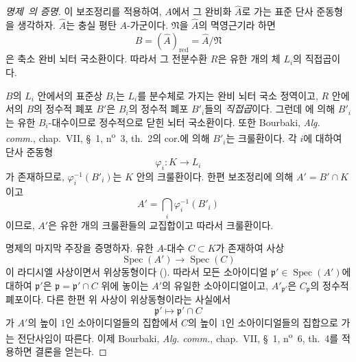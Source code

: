 \begin{proof}[명제~의 증명]
이 보조정리를 적용하여, $A$에서 그 완비화 $\widehat A$로 가는 표준
단사 준동형을 생각하자. $\widehat A$는 충실 평탄 $A$-가군이다.
$\mathfrak N$을 $\widehat A$의 멱영근기라 하면
\[
  B=(\widehat A)_{\mathrm{red}}=\widehat A/\mathfrak N
\]
은 축소 완비 뇌터 국소환이다. 따라서 그 전분수환 $R$은 유한 개의
체 $L_i$의 직접곱이다.


$B$의 $L_i$ 안에서의 표준상 $B_i$는 $L_i$를 분수체로 가지는
완비 뇌터 국소 정역이고, $R$ 안에서의 $B$의 정수적 폐포 $B'$은
$B_i$의 정수적 폐포 $B'_i$들의 \emph{직접곱}이다. 그런데
에 의해 $B'_i$는 유한 $B_i$-대수이므로 정수적으로
닫힌 뇌터 국소환이다. 또한 Bourbaki, \emph{Alg. comm.}, chap.~VII,
§~1, n\textsuperscript{o}~3, th.~2의 cor.에 의해 $B'_i$는
크룰환이다. 각 $i$에 대하여 단사 준동형
\[
  \varphi_i:K\longrightarrow L_i
\]
가 존재하므로, $\varphi_i^{-1}(B'_i)$는 $K$ 안의 크룰환이다. 한편
보조정리에 의해 $A'=B'\cap K$이고
\[
  A'=\bigcap_i\varphi_i^{-1}(B'_i)
\]
이므로, $A'$은 유한 개의 크룰환들의 교집합이고 따라서 크룰환이다.

명제의 마지막 주장을 증명하자. 유한 $A$-대수 $C\subset K$가
존재하여 사상
\[
  \operatorname{Spec}(A')\longrightarrow\operatorname{Spec}(C)
\]
이 라디시엘 사상이면서 위상동형이다 (). 따라서
모든 소아이디얼 $\mathfrak p'\in\operatorname{Spec}(A')$에 대하여
$\mathfrak p'$은 $\mathfrak p=\mathfrak p'\cap C$ 위에 놓이는
$A'$의 유일한 소아이디얼이고, $A'_{\mathfrak p'}$은
$C_{\mathfrak p}$의 정수적 폐포이다. 다른 한편 위 사상이
위상동형이라는 사실에서
\[
  \mathfrak p'\longmapsto\mathfrak p'\cap C
\]
가 $A'$의 높이 $1$인 소아이디얼들의 집합에서 $C$의 높이 $1$인
소아이디얼들의 집합으로 가는 전단사임이 따른다. 이제 Bourbaki,
\emph{Alg. comm.}, chap.~VII, §~1, n\textsuperscript{o}~6,
th.~4를 적용하면 결론을 얻는다.
\end{proof}

